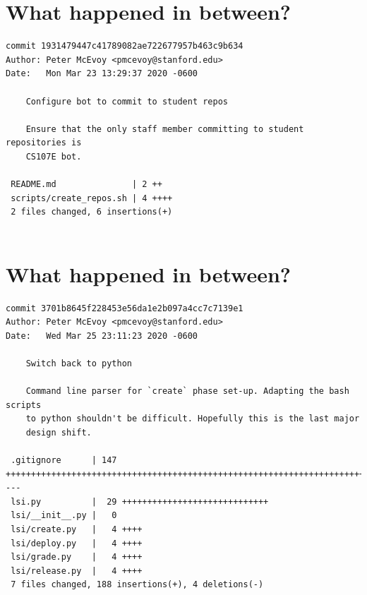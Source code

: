 \documentclass{article}
\begin{document}
\newpage

\section*{What happened in between?}
\vspace{2ex}
\begin{verbatim}
commit 1931479447c41789082ae722677957b463c9b634
Author: Peter McEvoy <pmcevoy@stanford.edu>
Date:   Mon Mar 23 13:29:37 2020 -0600

    Configure bot to commit to student repos
    
    Ensure that the only staff member committing to student repositories is
    CS107E bot.

 README.md               | 2 ++
 scripts/create_repos.sh | 4 ++++
 2 files changed, 6 insertions(+)


\end{verbatim}

\newpage

\section*{What happened in between?}
\vspace{2ex}
\begin{verbatim}
commit 3701b8645f228453e56da1e2b097a4cc7c7139e1
Author: Peter McEvoy <pmcevoy@stanford.edu>
Date:   Wed Mar 25 23:11:23 2020 -0600

    Switch back to python
    
    Command line parser for `create` phase set-up. Adapting the bash scripts
    to python shouldn't be difficult. Hopefully this is the last major
    design shift.

 .gitignore      | 147 +++++++++++++++++++++++++++++++++++++++++++++++++++++++++++++++++++++++++++++++++++++++++++++++++++++++++++++++++++++++++++++++++++++++++++++++----
 lsi.py          |  29 +++++++++++++++++++++++++++++
 lsi/__init__.py |   0
 lsi/create.py   |   4 ++++
 lsi/deploy.py   |   4 ++++
 lsi/grade.py    |   4 ++++
 lsi/release.py  |   4 ++++
 7 files changed, 188 insertions(+), 4 deletions(-)

\end{verbatim}

\newpage
\end{document}
